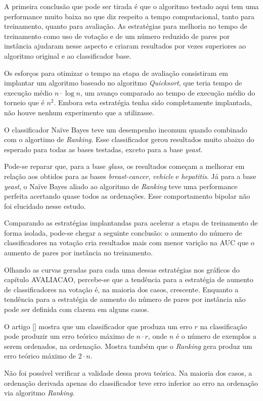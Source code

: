 A primeira conclusão que pode ser tirada é que o algoritmo testado aqui tem uma performance muito baixa no que diz respeito a tempo computacional, tanto para treinamento, quanto para avaliação. As estratégias para melhoria no tempo de treinamento como uso de votação e de um número reduzido de pares por instância ajudaram nesse aspecto e criaram resultados por vezes superiores ao algoritmo original e ao classificador base.

Os esforços para otimizar o tempo na etapa de avaliação consistiram em implantar um algoritmo baseado no algoritmo \emph{Quicksort}, que teria tempo de execução médio $n\cdot\log{n}$, um avanço comparado ao tempo de execução médio do torneio que é $n^2$. Embora esta estratégia tenha sido completamente implantada, não houve nenhum experimento que a utilizasse.

O classificador Naïve Bayes teve um desempenho incomum quando combinado com o algortimo de \emph{Ranking}. Esse classificador gerou resultados muito abaixo do esperado para todas as bases testadas, exceto para a base \emph{yeast}.

Pode-se reparar que, para a base \emph{glass}, os resultados começam a melhorar em relação aos obtidos para as bases \emph{breast-cancer}, \emph{vehicle} e \emph{hepatitis}. Já para a base \emph{yeast}, o Naïve Bayes aliado ao algoritmo de \emph{Ranking} teve uma performance perfeita acertando quase todos as ordenações. Esse comportamento bipolar não foi elucidado nesse estudo.

Comparando as estratégias implantandas para acelerar a etapa de treinamento de forma isolada, pode-se chegar a seguinte conclusão: o aumento do número de classificadores na votação cria resultados mais com menor varição na AUC que o aumento de pares por instância no treinamento.

Olhando as curvas geradas para cada uma dessas estratégias nos gráficos do capítulo {{AVALIACAO}}, percebe-se que a tendência para a estratégia de aumento de classificadores na votação é, na maioria dos casos, crescente. Enquanto a tendência para a estratégia de aumento do número de pares por instância não pode ser definida com clareza em alguns casos.

O artigo [\cite{langford08}] mostra que um classificador que produza um erro $r$ na classificação pode produzir um erro teórico máximo de $n \cdot r$, onde $n$ é o número de exemplos a serem ordenados, na ordenação. Mostra também que o \emph{Ranking} gera produz um erro teórico máximo de $2 \cdot n$.

Não foi possível verificar a validade dessa prova teórica. Na maioria dos casos, a ordenação derivada apenas do classificador teve erro inferior ao erro na ordenação via algoritmo \emph{Ranking}.